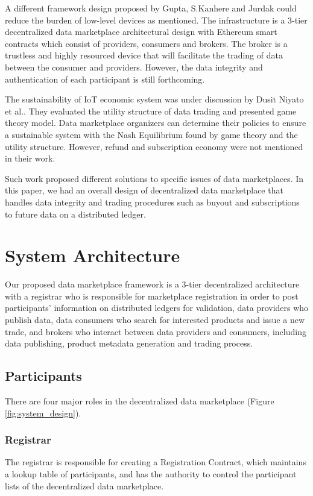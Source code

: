 \documentclass[journal,10pt,a4paper]{IEEEtran}
\begin{document}
A different framework design proposed by Gupta, S.Kanhere and Jurdak\cite{3tierDataMarket} could reduce the burden of low-level devices as mentioned. The infrastructure is a 3-tier decentralized data marketplace architectural design with Ethereum smart contracts which consist of providers, consumers and brokers. The broker is a trustless and highly resourced device that will facilitate the trading of data between the consumer and providers. However, the data integrity and authentication of each participant is still forthcoming.  

The sustainability of IoT economic system was under discussion by Dusit Niyato et al.\cite{UtilityStruct}. They evaluated the utility structure of data trading and presented game theory model.  Data marketplace organizers can determine their policies to ensure a sustainable system with the Nash Equilibrium found by game theory and the utility structure. However, refund and subscription economy were not mentioned in their work.

Such work proposed different solutions to specific issues of data marketplaces. In this paper, we had an overall design of decentralized data marketplace that handles data integrity and trading procedures such as buyout and subscriptions to future data on a distributed ledger.

\section{\normalsize\textbf{System Architecture}}
Our proposed data marketplace framework is a 3-tier decentralized architecture with a registrar who is responsible for marketplace registration in order to post participants' information on distributed ledgers for validation, data providers who publish data, data consumers who search for interested products and issue a new trade, and brokers who interact between data providers and consumers, including data publishing, product metadata generation and trading process.

\subsection{Participants}
There are four major roles in the decentralized data marketplace (Figure \ref{fig:system_design}).

\subsubsection{Registrar}
The registrar is responsible for creating a Registration Contract, which maintains a lookup table of participants, and has the authority to control the participant lists of the decentralized data marketplace. 
\end{document}
